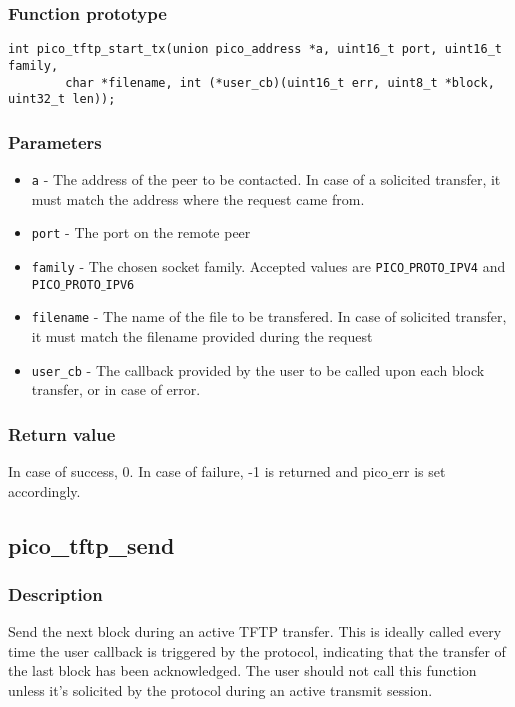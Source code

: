 \subsubsection*{Function prototype}
\begin{verbatim}
int pico_tftp_start_tx(union pico_address *a, uint16_t port, uint16_t family,
        char *filename, int (*user_cb)(uint16_t err, uint8_t *block, uint32_t len));
\end{verbatim}

\subsubsection*{Parameters}
\begin{itemize}[noitemsep]
\item \texttt{a} - The address of the peer to be contacted. In case of a solicited transfer, it must match the address where the request came from.
\item \texttt{port} - The port on the remote peer
\item \texttt{family} - The chosen socket family. Accepted values are \texttt{PICO$\_$PROTO$\_$IPV4} and \texttt{PICO$\_$PROTO$\_$IPV6}
\item \texttt{filename} - The name of the file to be transfered. In case of solicited transfer, it must match the filename provided during the request
\item \texttt{user\_cb} - The callback provided by the user to be called upon each block transfer, or in case of error.
\end{itemize}

\subsubsection*{Return value}
In case of success, 0. In case of failure, -1 is returned and pico$\_$err is set accordingly.


\subsection{pico\_tftp\_send}
\subsubsection*{Description}
Send the next block during an active TFTP transfer. This is ideally called every time the user callback is triggered by the protocol, indicating that the transfer of the last block has been acknowledged. The user should not call this function unless it's solicited by the protocol during an active transmit session.


